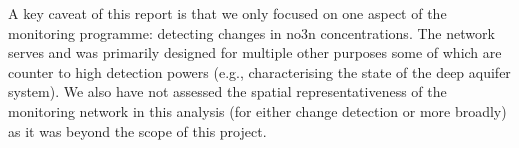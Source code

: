 A key caveat of this report is that we only focused on one aspect of the monitoring programme: detecting changes in \gls{no3n} concentrations. The network serves and was primarily designed for multiple other purposes some of which are counter to high detection powers (e.g., characterising the state of the deep aquifer system). We also have not assessed the spatial representativeness of the monitoring network in this analysis (for either change detection or more broadly) as it was beyond the scope of this project.